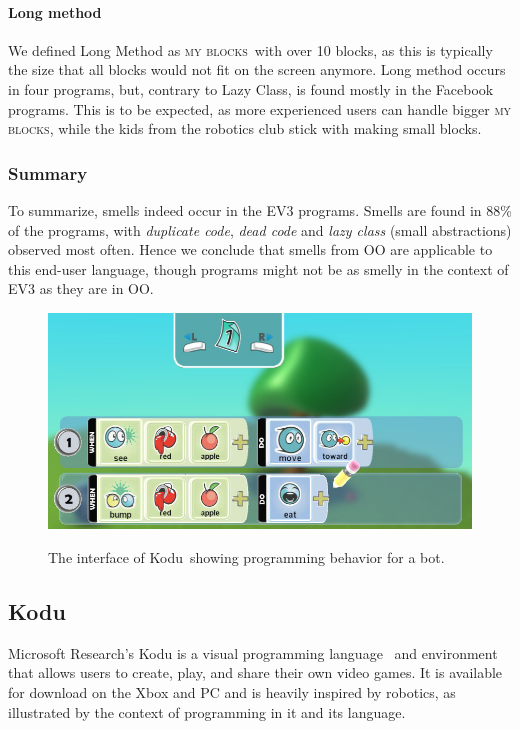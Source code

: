 \documentclass{sig-alternate}
\newcommand{\mbs}{\textsc{my blocks}}
\begin{document}
\paragraph{Long method}
We defined Long Method as \mbs~with over 10 blocks, as this is typically the size that all blocks would not fit on the screen anymore. Long method occurs in four programs, but, contrary to Lazy Class, is found mostly in the Facebook programs. This is to be expected, as more experienced users can handle bigger \mbs, while the kids from the robotics club stick with making small blocks.

\subsubsection{Summary}
To summarize, smells indeed occur in the EV3 programs. Smells are found in 88\% of the programs, with \emph{duplicate code}, \emph{dead code} and \emph{lazy class} (small abstractions) observed most often. Hence we conclude that smells from OO are applicable to this end-user language, though programs might not be as smelly in the context of EV3 as they are in OO. 

\begin{figure}[ht]
\caption{The interface of Kodu~showing programming behavior for a bot.}
\centering
\includegraphics[width=\columnwidth]{programmingui.png}
\label{fig:Kodu}
\end{figure}


\subsection{Kodu}
Microsoft Research's Kodu is a visual programming language~\cite{kodugrammar} and environment that allows users to create, play, and share their own video games. 
It is available for download on the Xbox and PC and is heavily inspired by robotics, as illustrated by the context of programming in it and its language. 
\end{document}
